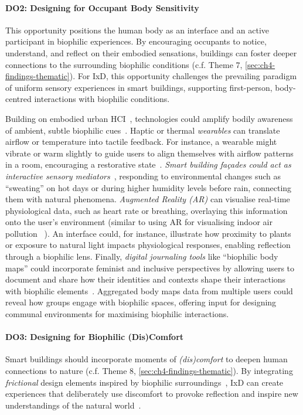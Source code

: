 \paragraph{DO2: Designing for Occupant Body Sensitivity}
This opportunity positions the human body as an interface and an active participant in biophilic experiences. By encouraging occupants to notice, understand, and reflect on their embodied sensations, buildings can foster deeper connections to the surrounding biophilic conditions  (c.f. Theme 7, \autoref{sec:ch4-findings-thematic}). For IxD, this opportunity challenges the prevailing paradigm of uniform sensory experiences in smart buildings, supporting first-person, body-centred interactions with biophilic conditions. 

Building on embodied urban HCI~\cite{galvao2024posthumanist}, technologies could amplify bodily awareness of ambient, subtle biophilic cues~\cite{tsaknaki2021feeling}. Haptic or thermal \emph{wearables} can translate airflow or temperature into tactile feedback. For instance, a wearable might vibrate or warm slightly to guide users to align themselves with airflow patterns in a room, encouraging a restorative state~\cite{sabinson2024every}. \emph{Smart building fa\c{c}ades could act as interactive sensory mediators}~\cite{srisuwan2022applications, rao2025smart}, responding to environmental changes such as ``sweating'' on hot days or during higher humidity levels before rain, connecting them with natural phenomena. \emph{Augmented Reality (AR)} can visualise real-time physiological data, such as heart rate or breathing, overlaying this information onto the user’s environment (similar to using AR for visualising indoor air pollution ~\cite{jarrahi2024enhancing}). An interface could, for instance, illustrate how proximity to plants or exposure to natural light impacts physiological responses, enabling reflection through a biophilic lens. Finally, \emph{digital journaling tools} like ``biophilic body maps'' could incorporate feminist and inclusive perspectives by allowing users to document and share how their identities and contexts shape their interactions with biophilic elements~\cite{turmo2023towards}. Aggregated body maps data from multiple users could reveal how groups engage with biophilic spaces, offering input for designing communal environments for maximising biophilic interactions.


\paragraph{DO3: Designing for Biophilic (Dis)Comfort}
Smart buildings should incorporate moments of \emph{(dis)comfort} to deepen human connections to nature (c.f. Theme 8, \autoref{sec:ch4-findings-thematic}). By integrating \emph{frictional} design elements inspired by biophilic surroundings~\cite{bixler1997nature}, IxD can create experiences that deliberately use discomfort to provoke reflection and inspire new understandings of the natural world~\cite{pezeu2013philosophy, rao2025smart}. 

